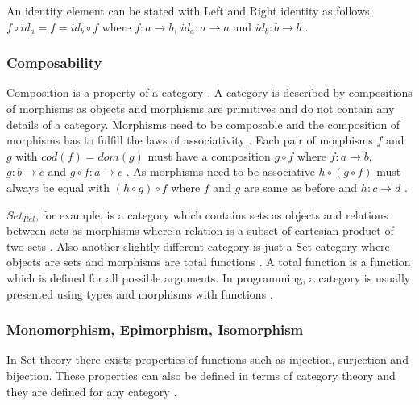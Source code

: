 \documentclass[article]{aaltoseries}
\begin{document}
    An identity element can be stated with Left and Right identity as follows.
    $f \circ id_a = f = id_b \circ f$ where $f: a \rightarrow b$, $id_a: a
    \rightarrow a$ and $id_b: b \rightarrow b$ \cite{barr1990category, computational}.


  \subsubsection{Composability}
    Composition is a property of a category \cite{barr1990category,
      mac2013categories}. A category is described by compositions of morphisms
    as objects and morphisms are primitives and do not contain any details of a
    category. Morphisms need to be composable and the composition of morphisms
    has to fulfill the laws of associativity \cite{barr1990category,
      mac2013categories, computational}. Each pair of morphisms $f$ and $g$ with
    $cod(f) = dom(g)$ must have a composition $g \circ f$ where $f: a
    \rightarrow b$, $g: b \rightarrow c$ and $g \circ f: a \rightarrow c$
    \cite{mac2013categories}. As morphisms need to be associative $h \circ (g
    \circ f)$ must always be equal with $(h \circ g) \circ f$ where $f$ and $g$
    are same as before and $h: c \rightarrow d$ \cite{awodey2006category,
      barr1990category, eilenberg1945general, mac2013categories, computational}.
 
    $Set_{Rel}$, for example, is a category which contains sets as
    objects and relations between sets as morphisms where a relation is a subset
    of cartesian product of two sets \cite{computational}. Also another slightly
    different category is just a Set category where objects are sets and morphisms
    are total functions \cite{barr1990category, computational}. A total function
    is a function which is defined for all possible arguments. In programming, a
    category is usually presented using types and morphisms with functions
    \cite{computational}.


  \subsubsection{Monomorphism, Epimorphism, Isomorphism}
    In Set theory there exists properties of functions such as injection,
    surjection and bijection. These properties can also be defined in terms of
    category theory and they are defined for any category \cite{barr1990category}.
\end{document}
